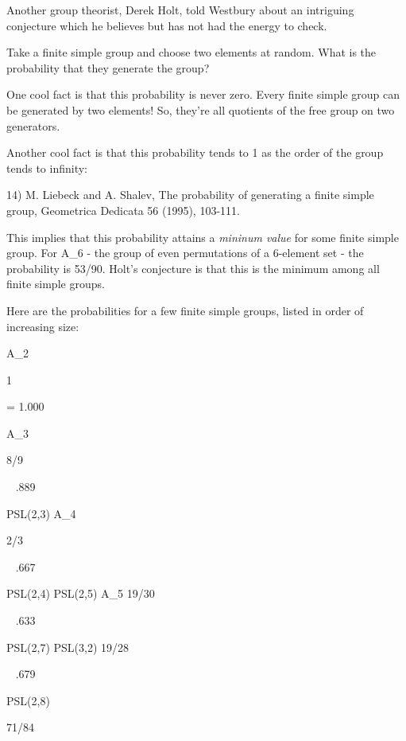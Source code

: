Another group theorist, Derek Holt, told Westbury about an intriguing
conjecture which he believes but has not had the energy to check.

Take a finite simple group and choose two elements at random.  What 
is the probability that they generate the group?  

One cool fact is that this probability is never zero.  Every finite
simple group can be generated by two elements!  So, they're all
quotients of the free group on two generators.

Another cool fact is that this probability tends to 1 as the order of
the group tends to infinity:

14) M. Liebeck and A. Shalev, The probability of generating a finite 
simple group, Geometrica Dedicata 56 (1995), 103-111.

This implies that this probability attains a \emph{mininum value} for
some finite simple group.  For A_{6} - the group of even
permutations of a 6-element set - the probability is 53/90.  Holt's
conjecture is that this is the minimum among all finite simple groups.

Here are the probabilities for a few finite simple groups, listed
in order of increasing size:

A_{2}                 
                          
                                      1     
                      
                                   = 1.000

A_{3}                
                            
            
8/9   
                     
       
           ~ .889

PSL(2,3) \cong  A_{4}              
              
              
  2/3    
   
                             
    
   ~ .667

PSL(2,4) \cong  PSL(2,5) \cong  A_{5}      
19/30
                                  
~ .633

PSL(2,7) \cong  PSL(3,2)                          
19/28
                                        
              
~ .679

PSL(2,8)                  
                     
                                   71/84
                  
